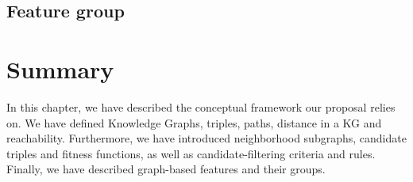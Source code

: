 

\subsection{Feature group}



\section{Summary}\label{sec:theo-conclusion}
In this chapter, we have described the conceptual framework our proposal relies on. We have defined Knowledge Graphs, triples, paths, distance in a KG and reachability. Furthermore, we have introduced neighborhood subgraphs, candidate triples and fitness functions, as well as candidate-filtering criteria and rules. Finally, we have described graph-based features and their groups.